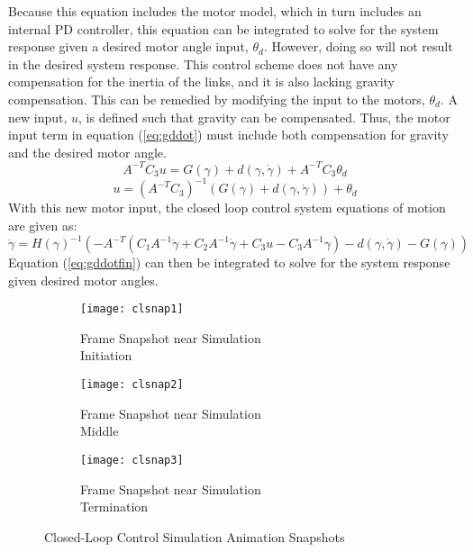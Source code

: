 Because this equation includes the motor model, which in turn includes an internal PD controller, this equation can be integrated to solve for the system response given a desired motor angle input, $\theta_d$. However, doing so will not result in the desired system response. This control scheme does not have any compensation for the inertia of the links, and it is also lacking gravity compensation. This can be remedied by modifying the input to the motors, $\theta_d$. A new input, $u$, is defined such that gravity can be compensated. Thus, the motor input term in equation (\ref{eq:gddot}) must include both compensation for gravity and the desired motor angle.
\[
A^{-T} C_3  u=G(\gamma)+d(\gamma, \dot{\gamma})+A^{-T} C_3\theta_{d}
\]
\begin{equation}
u=\left(A^{-T} C_3\right)^{-1} \left(G(\gamma)+d(\gamma, \dot{\gamma})\right) + \theta_{d}
\end{equation}
With this new motor input, the closed loop control system equations of motion are given as:
\begin{equation}
\ddot{\gamma}=H(\gamma)^{-1}\left(-A^{-T}\left(C_1 A^{-1} \ddot{\gamma}+C_2 A^{-1} \dot{\gamma}+C_3 u-C_3A^{-1} \gamma\right)-d(\gamma, \dot{\gamma})-G(\gamma)\right)
\label{eq:gddotfin}
\end{equation}
Equation (\ref{eq:gddotfin}) can then be integrated to solve for the system response given desired motor angles.

\begin{figure}[htp]
  \center
  \begin{subfigure}[c]{0.33\textwidth}
    \center
    \texttt{[image: clsnap1]}
    \caption{Frame Snapshot near Simulation \\Initiation}
  \end{subfigure}%
  \begin{subfigure}[c]{0.33\textwidth}
    \center
    \texttt{[image: clsnap2]}
    \caption{Frame Snapshot near Simulation \\Middle}
  \end{subfigure}%
\begin{subfigure}[c]{0.33\textwidth}
  \center
  \texttt{[image: clsnap3]}
  \caption{Frame Snapshot near Simulation \\Termination}
\end{subfigure}
  \caption{Closed-Loop Control Simulation Animation Snapshots}
  \label{fig:clsnaps}
\end{figure}

